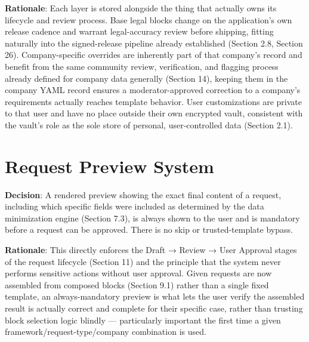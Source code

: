 \textbf{Rationale}: Each layer is stored alongside the thing that actually owns its lifecycle and review process. Base legal blocks change on the application's own release cadence and warrant legal-accuracy review before shipping, fitting naturally into the signed-release pipeline already established (Section 2.8, Section 26). Company-specific overrides are inherently part of that company's record and benefit from the same community review, verification, and flagging process already defined for company data generally (Section 14), keeping them in the company YAML record ensures a moderator-approved correction to a company's requirements actually reaches template behavior. User customizations are private to that user and have no place outside their own encrypted vault, consistent with the vault's role as the sole store of personal, user-controlled data (Section 2.1).
\section{Request Preview System}
\textbf{Decision}: A rendered preview showing the exact final content of a request, including which specific fields were included as determined by the data minimization engine (Section 7.3), is always shown to the user and is mandatory before a request can be approved. There is no skip or trusted-template bypass.

\textbf{Rationale}: This directly enforces the Draft → Review → User Approval stages of the request lifecycle (Section 11) and the principle that the system never performs sensitive actions without user approval. Given requests are now assembled from composed blocks (Section 9.1) rather than a single fixed template, an always-mandatory preview is what lets the user verify the assembled result is actually correct and complete for their specific case, rather than trusting block selection logic blindly — particularly important the first time a given framework/request-type/company combination is used.


\sentinelchapterend